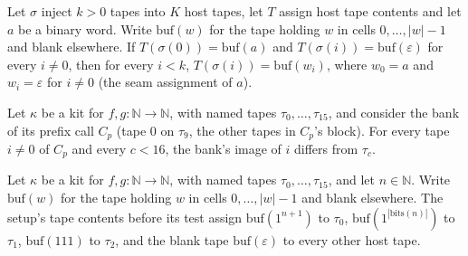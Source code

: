 \begin{theorem}
\label{Turing.NTimeDiag.qy_arg_bank}
\leanok
{}
Let $\sigma$ inject $k > 0$ tapes into $K$ host tapes, let $T$ assign host tape contents and let $a$
be a binary word. Write $\mathrm{buf}(w)$ for the tape holding $w$ in cells $0, \dots, |w| - 1$ and
blank elsewhere. If $T(\sigma(0)) = \mathrm{buf}(a)$ and $T(\sigma(i)) = \mathrm{buf}(\varepsilon)$
for every $i \ne 0$, then for every $i < k$, $T(\sigma(i)) = \mathrm{buf}(w_i)$, where $w_0 = a$
and $w_i = \varepsilon$ for $i \ne 0$ (the seam assignment of $a$).
\end{theorem}

\begin{theorem}
\label{Turing.NTimeDiag.QyKit.bPr_ne}
\leanok
{}
Let $\kappa$ be a kit for $f, g : \mathbb{N} \to \mathbb{N}$, with named tapes $\tau_0, \dots,
\tau_{15}$, and consider the bank of its prefix call $C_p$ (tape $0$ on $\tau_9$, the other tapes
in $C_p$'s block). For every tape $i \ne 0$ of $C_p$ and every $c < 16$, the bank's image of $i$
differs from $\tau_c$.
\end{theorem}

\begin{definition}
\label{Turing.NTimeDiag.qySetT5}
\leanok
{}
Let $\kappa$ be a kit for $f, g : \mathbb{N} \to \mathbb{N}$, with named tapes $\tau_0, \dots,
\tau_{15}$, and let $n \in \mathbb{N}$. Write $\mathrm{buf}(w)$ for the tape holding $w$ in cells
$0, \dots, |w| - 1$ and blank elsewhere. The setup's tape contents before its test assign
$\mathrm{buf}(1^{n+1})$ to $\tau_0$, $\mathrm{buf}(1^{|\mathrm{bits}(n)|})$ to $\tau_1$,
$\mathrm{buf}(111)$ to $\tau_2$, and the blank tape $\mathrm{buf}(\varepsilon)$ to every other host
tape.
\end{definition}

